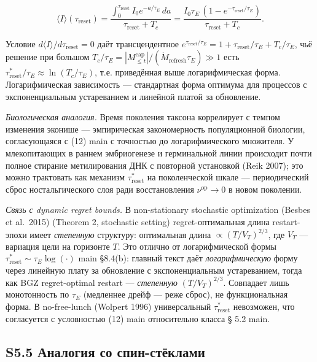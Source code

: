 \documentclass[pdflatex,sn-mathphys-ay]{sn-jnl}
\begin{document}
\[\langle I\rangle(\tau_{\text{reset}}) = \frac{\int_0^{\tau_{\text{reset}}} I_0 e^{-a/\tau_E}\,da}{\tau_{\text{reset}} + T_c} = \frac{I_0\tau_E\,(1 - e^{-\tau_{\text{reset}}/\tau_E})}{\tau_{\text{reset}} + T_c}.\]



Условие \(d\langle I\rangle/d\tau_{\text{reset}} = 0\) даёт трансцендентное \(e^{\tau_{\text{reset}}/\tau_E} = 1 + \tau_{\text{reset}}/\tau_E + T_c/\tau_E\), чьё решение при большом \(T_c/\tau_E = |M_{\le t}^{\text{cap}}|/(\dot M_{\text{refresh}}\tau_E) \gg 1\) есть \(\tau_{\text{reset}}^*/\tau_E \approx \ln(T_c/\tau_E)\), т.е. приведённая выше логарифмическая форма. Логарифмическая зависимость --- стандартная форма оптимума для процессов с экспоненциальным устареванием и линейной платой за обновление.



\emph{Биологическая аналогия.} Время поколения таксона коррелирует с темпом изменения эконише --- эмпирическая закономерность популяционной биологии, согласующаяся с (12) main с точностью до логарифмического множителя. У млекопитающих в раннем эмбриогенезе и герминальной линии происходит почти полное стирание метилирования ДНК с повторной установкой (Reik 2007); это можно трактовать как механизм \(\tau_{\text{reset}}^*\) на поколенческой шкале --- периодический сброс ностальгического слоя ради восстановления \(\nu^{\text{op}} \to 0\) в новом поколении.



\emph{Связь с dynamic regret bounds.} В non-stationary stochastic optimization (Besbes et al.~2015) (Theorem 2, stochastic setting) regret-оптимальная длина restart-эпохи имеет \emph{степенную} структуру: оптимальная длина \(\propto (T/V_T)^{2/3}\), где \(V_T\) --- вариация цели на горизонте \(T\). Это отлично от логарифмической формы \(\tau_{\text{reset}}^* \sim \tau_E \log(\cdot)\) main §8.4(b): главный текст даёт \emph{логарифмическую} форму через линейную плату за обновление с экспоненциальным устареванием, тогда как BGZ regret-optimal restart --- \emph{степенную} \((T/V_T)^{2/3}\). Совпадает лишь монотонность по \(\tau_E\) (медленнее дрейф --- реже сброс), не функциональная форма. В no-free-lunch (Wolpert 1996) универсальный \(\tau_{\text{reset}}^*\) невозможен, что согласуется с условностью (12) main относительно класса § 5.2 main.



\subsection*{S5.5 Аналогия со спин-стёклами}\label{s5.5-ux430ux43dux430ux43bux43eux433ux438ux44f-ux441ux43e-ux441ux43fux438ux43d-ux441ux442ux451ux43aux43bux430ux43cux438}
\end{document}
